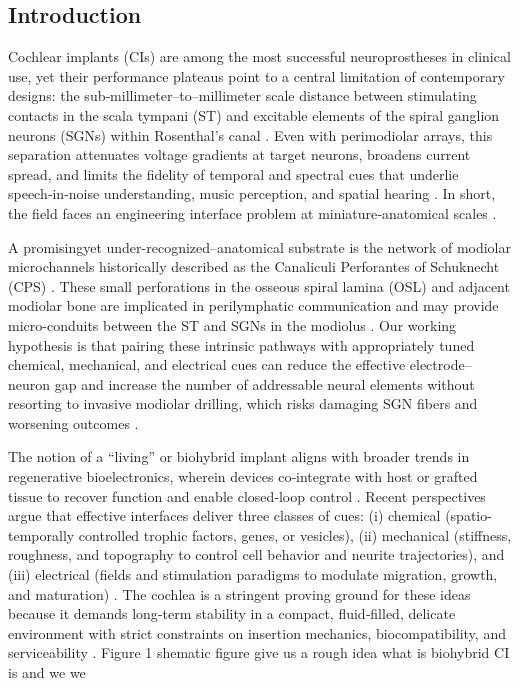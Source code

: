 \documentclass[referee,pdflatex, sn-vancouver-num]{sn-jnl}%
\theoremstyle{thmstyleone}%
\theoremstyle{thmstyletwo}%
\theoremstyle{thmstylethree}%
\DeclareRobustCommand{\textendash}{\ifmmode\text{-}\else\leavevmode\hbox{--}\fi}
\begin{document}
\subsection{Introduction}
Cochlear implants (CIs) are among the most successful neuroprostheses in clinical use, yet their performance plateaus point to a central limitation of contemporary designs: the sub‑millimeter–to–millimeter scale distance between stimulating contacts in the scala tympani (ST) and excitable elements of the spiral ganglion neurons (SGNs) within Rosenthal's canal \cite{wilson2008,wilson2014, Wilson2019_LancetCommissionHearingLoss}. Even with perimodiolar arrays, this separation attenuates voltage gradients at target neurons, broadens current spread, and limits the fidelity of temporal and spectral cues that underlie speech‑in‑noise understanding, music perception, and spatial hearing \cite{wilson2008,wilson2014, Vecchi2024}. In short, the field faces an engineering interface problem at miniature‑anatomical scales \cite{Lien2025_SciRep_ENI}.

A promising\textemdash yet under-recognized\textendash anatomical substrate is the network of modiolar microchannels historically described as the Canaliculi Perforantes of Schuknecht (CPS) \cite{Schuknecht1959}. These small perforations in the osseous spiral lamina (OSL) and adjacent modiolar bone are implicated in perilymphatic communication and may provide micro-conduits between the ST and SGNs in the modiolus \cite{Starovoyt2023_SciRep_CochleaMicroCT, Braga2023_JMicrosc_OSL}. Our working hypothesis is that pairing these intrinsic pathways with appropriately tuned chemical, mechanical, and electrical cues can reduce the effective electrode\textendash neuron gap and increase the number of addressable neural elements without resorting to invasive modiolar drilling, which risks damaging SGN fibers and worsening outcomes \cite{Vecchi2024, Sriperumbudur2024_SciRep_ModPorosity, Nella2022NeurotrophinGradients}.

The notion of a “living” or biohybrid implant aligns with broader trends in regenerative bioelectronics, wherein devices co‑integrate with host or grafted tissue to recover function and enable closed‑loop control \cite{Roemer2016}. Recent perspectives argue that effective interfaces deliver three classes of cues: (i) chemical (spatio-temporally controlled trophic factors, genes, or vesicles), (ii) mechanical (stiffness, roughness, and topography to control cell behavior and neurite trajectories), and (iii) electrical (fields and stimulation paradigms to modulate migration, growth, and maturation) \cite{CarnicerLombarte2024AdvMat, Fenov2024_LION_BiohybridElectrode}. The cochlea is a stringent proving ground for these ideas because it demands long‑term stability in a compact, fluid‑filled, delicate environment with strict constraints on insertion mechanics, biocompatibility, and serviceability \cite{Vecchi2024}.
Figure 1 shematic figure give us a rough idea what is biohybrid CI is and we we
\end{document}
